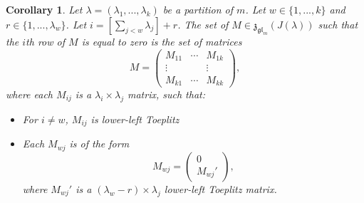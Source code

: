 \documentclass[12pt,psamsfonts]{article}
\DeclareMathOperator{\gl}{\mathfrak{gl}}
\newtheorem{corollary}[theorem]{Corollary}
\begin{document}
\begin{corollary}\label{nilpotent_centralizer_row_zero}
    Let \(\lambda = (\lambda_1, ..., \lambda_k)\) be a partition of \(m\).
    Let \(w \in \{1, ..., k\}\) and \(r \in \{1, ..., \lambda_w\}\).
    Let \(i = [\sum_{j < w} \lambda_j] + r\).
    The set of \(M \in \mathfrak{z}_{\gl_m}(J(\lambda))\) such that the \(i\)th row of \(M\) is equal to zero is the set of matrices
    \[M = \begin{pmatrix}
        M_{11} & \cdots & M_{1k} \\
        \vdots & & \vdots\\
        M_{k1} & \cdots & M_{kk}
    \end{pmatrix},\]
    where each \(M_{ij}\) is a \(\lambda_i \times \lambda_j\) matrix, such that:
    \begin{itemize}
        \item For \(i \neq w\), \(M_{ij}\) is lower-left Toeplitz
        \item Each \(M_{wj}\) is of the form
        \[M_{wj} = \begin{pmatrix}
            0\\
            M_{wj}'
        \end{pmatrix},\]
        where \(M_{wj}'\) is a \((\lambda_w - r) \times \lambda_j\) lower-left Toeplitz matrix.
    \end{itemize}
\end{corollary}
\end{document}
